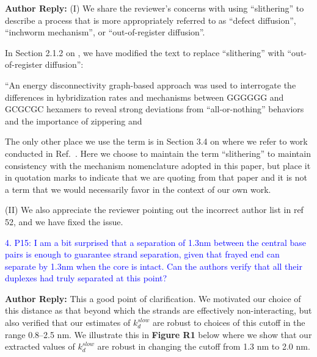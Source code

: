 \documentclass[11pt,a4paper]{letter} %
\newcommand*{\rood}[1]{{\color{red}{#1}}}
\begin{document}
\textbf{Author Reply:}    (I) We share the reviewer's concerns with using ``slithering'' to describe a process that is more appropriately referred to as ``defect diffusion'', ``inchworm mechanism'', or ``out-of-register diffusion''.

In Section 2.1.2 on \rood{p.~8}, we have modified the text to replace ``slithering'' with ``out-of-register diffusion'':

``An energy disconnectivity graph-based approach was used to interrogate the differences in hybridization rates and mechanisms between GGGGGG and GCGCGC hexamers to reveal strong deviations from ``all-or-nothing'' behaviors and the importance of zippering and \rood{out-of-register diffusion mechanisms.~\citep{Xiao2019}''}

The only other place we use the term is in Section 3.4 on \rood{p.~27} where we refer to work conducted in Ref.~\citep{Xiao2019}. Here we choose to maintain the term ``slithering'' to maintain consistency with the mechanism nomenclature adopted in this paper, but place it in quotation marks to indicate that we are quoting from that paper and it is not a term that we would necessarily favor in the context of our own work.

\rood{``Out-of-register states for 5$^\prime$-GCGCGC-3$^\prime$ hexamers were identified as deep kinetic traps along the hybridization pathway and ``slithering'' through these states did not provide a significant hybridization pathway compared to an alternative ``zippering'' mechanism. (In contrast, out-of-register slithering and in-register zippering served as two parallel pathways for hybridization of 5$^\prime$-GGGGGG-3$^\prime$.)'' }

(II) We also appreciate the reviewer pointing out the incorrect author list in ref 52, and we have fixed the issue.





\textcolor{blue}{4. P15: I am a bit surprised that a separation of 1.3nm between the central base pairs is enough to guarantee strand separation, given that frayed end can separate by 1.3nm when the core is intact. Can the authors verify that all their duplexes had truly separated at this point?}

\textbf{Author Reply:}   This a good point of clarification. We motivated our choice of this distance as that beyond which the strands are effectively non-interacting, but also verified that our estimates of $k_d^{slow}$ are robust to choices of this cutoff in the range 0.8--2.5 nm. We illustrate this in \textbf{Figure R1} below where we show that our extracted values of $k_d^{slow}$ are robust in changing the cutoff from 1.3 nm to 2.0 nm.  
\end{document}
